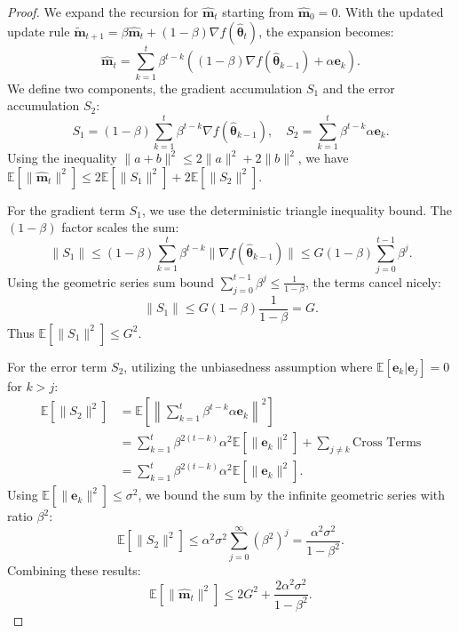 \documentclass[11pt, a4paper, onecolumn, copyright, goog]{google}
\newcommand{\vect}[1]{\mathbf{#1}}
\newcommand{\vtheta}{\boldsymbol{\theta}}
\newcommand{\vm}{\vect{m}}
\newcommand{\ve}{\vect{e}}
\newcommand{\E}{\mathbb{E}}
\theoremstyle{plain}
\theoremstyle{definition}
\theoremstyle{remark}
\begin{document}
\begin{proof}
We expand the recursion for $\hat{\vm}_t$ starting from $\hat{\vm}_0 = 0$. With the updated update rule $\tilde{\vm}_{t+1} = \beta \hat{\vm}_t + (1-\beta) \nabla f(\hat{\vtheta}_t)$, the expansion becomes:
\begin{equation}
    \hat{\vm}_t = \sum_{k=1}^{t} \beta^{t-k} \left( (1-\beta)\nabla f(\hat{\vtheta}_{k-1}) + \alpha \ve_k \right).
\end{equation}
We define two components, the gradient accumulation $S_1$ and the error accumulation $S_2$:
\begin{equation}
    S_1 = (1-\beta) \sum_{k=1}^{t} \beta^{t-k} \nabla f(\hat{\vtheta}_{k-1}), \quad S_2 = \sum_{k=1}^{t} \beta^{t-k} \alpha \ve_k.
\end{equation}
Using the inequality $\|a+b\|^2 \le 2\|a\|^2 + 2\|b\|^2$, we have $\E[\|\hat{\vm}_t\|^2] \le 2\E[\|S_1\|^2] + 2\E[\|S_2\|^2]$.

For the gradient term $S_1$, we use the deterministic triangle inequality bound. The $(1-\beta)$ factor scales the sum:
\begin{equation}
    \|S_1\| \le (1-\beta) \sum_{k=1}^{t} \beta^{t-k} \|\nabla f(\hat{\vtheta}_{k-1})\| \le G (1-\beta) \sum_{j=0}^{t-1} \beta^j.
\end{equation}
Using the geometric series sum bound $\sum_{j=0}^{t-1} \beta^j \le \frac{1}{1-\beta}$, the terms cancel nicely:
\begin{equation}
    \|S_1\| \le G (1-\beta) \frac{1}{1-\beta} = G.
\end{equation}
Thus $\E[\|S_1\|^2] \le G^2$.

For the error term $S_2$, utilizing the unbiasedness assumption where $\E[\ve_k | \ve_{j}] = 0$ for $k > j$:
\begin{align}
    \E[\|S_2\|^2] &= \E\left[ \left\| \sum_{k=1}^{t} \beta^{t-k} \alpha \ve_k \right\|^2 \right] \nonumber \\
    &= \sum_{k=1}^{t} \beta^{2(t-k)} \alpha^2 \E[\|\ve_k\|^2] + \sum_{j \neq k} \text{Cross Terms} \nonumber \\
    &= \sum_{k=1}^{t} \beta^{2(t-k)} \alpha^2 \E[\|\ve_k\|^2].
\end{align}
Using $\E[\|\ve_k\|^2] \le \sigma^2$, we bound the sum by the infinite geometric series with ratio $\beta^2$:
\begin{equation}
    \E[\|S_2\|^2] \le \alpha^2 \sigma^2 \sum_{j=0}^{\infty} (\beta^2)^j = \frac{\alpha^2 \sigma^2}{1-\beta^2}.
\end{equation}
Combining these results:
\begin{equation}
    \E[\|\hat{\vm}_t\|^2] \le 2G^2 + \frac{2\alpha^2 \sigma^2}{1-\beta^2}.
\end{equation}
\end{proof}
\end{document}

